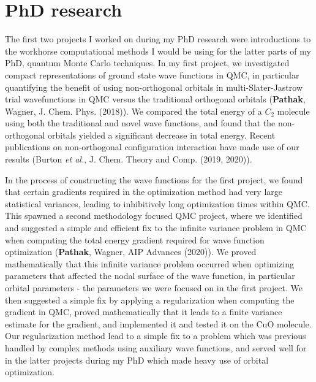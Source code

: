 \documentclass{article}
\begin{document}
\section{PhD research}
The first two projects I worked on during my PhD research were introductions to the workhorse computational methods I would be using for the latter parts of my PhD, quantum Monte Carlo techniques.
In my first project, we investigated compact representations of ground state wave functions in QMC, in particular quantifying the benefit of using non-orthogonal orbitals in multi-Slater-Jastrow trial wavefunctions in QMC versus the traditional orthogonal orbitals (\textbf{Pathak}, Wagner,  J. Chem. Phys.  (2018)).
We compared the total energy of a $C_2$ molecule using both the traditional and novel wave functions, and found that the non-orthogonal orbitals yielded a significant decrease in total energy.
Recent publications on non-orthogonal configuration interaction have made use of our results (Burton \textit{et al.}, J. Chem. Theory and Comp. (2019, 2020)).

In the process of constructing the wave functions for the first project, we found that certain gradients required in the optimization method had very large statistical variances,  leading to inhibitively long optimization times within QMC.
This spawned a second methodology focused QMC project, where we identified and suggested a simple and efficient fix to the infinite variance problem in QMC when computing the total energy gradient required for wave function optimization (\textbf{Pathak}, Wagner, AIP Advances (2020)).
We proved mathematically that this infinite variance problem occurred when optimizing parameters that affected the nodal surface of the wave function, in particular orbital parameters - the parameters we were focused on in the first project.
We then suggested a simple fix by applying a regularization when computing the gradient in QMC,  proved mathematically that it leads to a finite variance estimate for the gradient, and implemented it and tested it on the CuO molecule.
Our regularization method lead to a simple fix to a problem which was previous handled by complex methods using auxiliary wave functions, and served well for in the latter projects during my PhD which made heavy use of orbital optimization.
\end{document}
